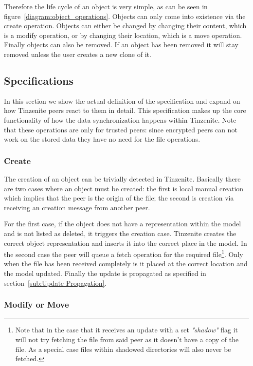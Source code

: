 Therefore the life cycle of an object is very simple, as can be seen in figure~\ref{diagram:object_operations}.
Objects can only come into existence via the create operation.
Objects can either be changed by changing their content, which is a modify operation, or by changing their location, which is a move operation.
Finally objects can also be removed.
If an object has been removed it will stay removed unless the user creates a new clone of it.

\subsection{Specifications}
\label{sub:Specifications}

In this section we show the actual definition of the specification and expand on how Tinzenite peers react to them in detail.
This specification makes up the core functionality of how the data synchronization happens within Tinzenite.
Note that these operations are only for trusted peers: since encrypted peers can not work on the stored data they have no need for the file operations.

\subsubsection{Create}
\label{subs:Create}

The creation of an object can be trivially detected in Tinzenite.
Basically there are two cases where an object must be created: the first is local manual creation which implies that the peer is the origin of the file; the second is creation via receiving an creation message from another peer.

For the first case, if the object does not have a representation within the model and is not listed as deleted, it triggers the creation case.
Tinzenite creates the correct object representation and inserts it into the correct place in the model.
In the second case the peer will queue a fetch operation for the required file\footnote{Note that in the case that it receives an update with a set \textit{"shadow"} flag it will not try fetching the file from said peer as it doesn't have a copy of the file. As a special case files within shadowed directories will also never be fetched.}.
Only when the file has been received completely is it placed at the correct location and the model updated.
Finally the update is propagated as specified in section~\ref{sub:Update Propagation}.

\subsubsection{Modify or Move}
\label{subs:Modify or Move}

